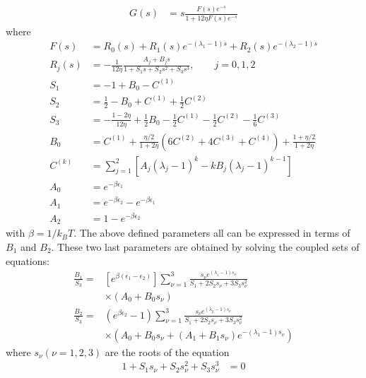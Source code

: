 \begin{align}
  G(s) &= s \frac{F(s)e^{-s}}{1+12\eta F(s)e^{-s}}
\end{align}
where
\begin{align}
F(s) &= R_0(s) + R_1(s)e^{-(\lambda_1-1)s} + R_2(s)e^{-(\lambda_2-1)s} \\
R_j(s) &= -\frac{1}{12\eta}\frac{A_j + B_js}{1 + S_1s + S_2s^2 + S_3s^3}, \qquad j=0,1,2 \\
S_1 &= -1+B_0-C^{(1)} \\
S_2 &=\frac12 - B_0+C^{(1)} +\frac12 C^{(2)} \\
S_3 &=-\frac{1-2\eta}{12\eta}+\frac12B_0-\frac12C^{(1)}-\frac12C^{(2)}-\frac16C^{(3)} \\
B_0 &= C^{(1)}+\frac{\eta/2}{1+2\eta}\left(6C^{(2)}+4C^{(3)}+C^{(4)}\right)+\frac{1+\eta/2}{1+2\eta}\\
C^{(k)}&=\sum_{j=1}^2\left[A_j\left(\lambda_j-1\right)^k-kB_j\left(\lambda_j-1\right)^{k-1}\right]\\
A_0&=e^{-\beta\epsilon_1}\\
A_1&=e^{-\beta\epsilon_2}-e^{-\beta\epsilon_1}\\
A_2&=1-e^{-\beta\epsilon_2}
\end{align}
with $\beta=1/k_BT$. The above defined parameters all can be expressed in terms of $B_1$ and $B_2$. These two last parameters are obtained by solving the coupled sets of equations:
\begin{align}
  \frac{B_1}{S_3} =& \left[e^{\beta(\epsilon_1-\epsilon_2)}\right] \sum_{\nu=1}^3\frac{s_\nu e^{(\lambda_1-1)s_\nu}}{S_1+2S_2s_\nu+3S_3s_\nu^2} \nonumber\\
   & \times (A_0+B_0s_\nu)\\
   \frac{B_2}{S_3} =&\left(e^{\beta\epsilon_2}-1\right)  \sum_{\nu=1}^3\frac{s_\nu e^{(\lambda_2-1)s_\nu}}{S_1+2S_2s_\nu+3S_3s_\nu^2} \nonumber\\
   & \times \left(A_0+B_0s_\nu+\left(A_1+B_1s_\nu\right)e^{-(\lambda_1-1)s_\nu}\right)
\end{align}
where $s_\nu (\nu=1,2,3)$ are the roots of the equation
\begin{align}
  1+S_1s_\nu+S_2s_\nu^2+S_3s_\nu^3&=0
\end{align}
\clearpage
